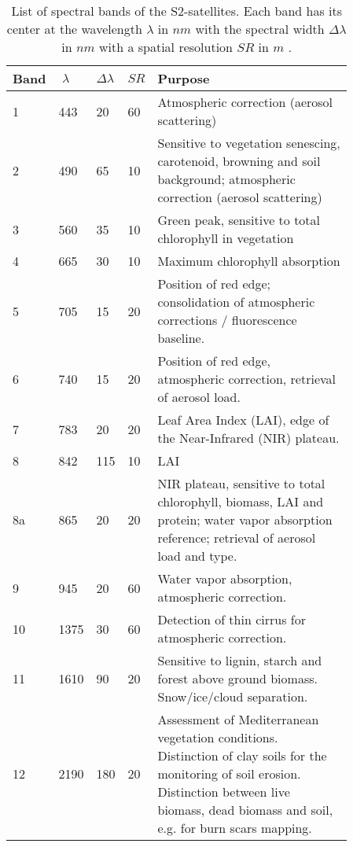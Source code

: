 \begin{table}[h]
    \centering
    \small
    \caption{List of spectral bands of the S2-satellites. Each band has its center at the wavelength $\lambda$ in $nm$ with the spectral width $\Delta\lambda$ in $nm$ with a spatial resolution $SR$ in $m$ \citep{jaramazESASentinel2Mission2013}.}
    \begin{tabular}{p{0.03\linewidth} p{0.04\linewidth} p{0.03\linewidth} p{0.03\linewidth} p{0.73\linewidth}}
    \toprule
        \hspace*{-5pt} Band & $\;\lambda$ & $\Delta\lambda$ & $SR$ & Purpose \\ \hline
        1 & 443 & 20 & 60 & Atmospheric correction (aerosol scattering) \\ %
        2 & 490 & 65 & 10 & Sensitive to vegetation senescing, carotenoid, browning and soil background; atmospheric correction (aerosol scattering) \\ %
        3 & 560 & 35 & 10 & Green peak, sensitive to total chlorophyll in vegetation \\ %
        4 & 665 & 30 & 10 & Maximum chlorophyll absorption \\ %
        5 & 705 & 15 & 20 & Position of red edge; consolidation of atmospheric corrections / fluorescence baseline. \\ %
        6 & 740 & 15 & 20 & Position of red edge, atmospheric correction, retrieval of aerosol load. \\ %
        7 & 783 & 20 & 20 & Leaf Area Index (LAI), edge of the Near-Infrared (NIR) plateau. \\ %
        8 & 842 & 115 & 10 & LAI \\ %
        8a & 865 & 20 & 20 & NIR plateau, sensitive to total chlorophyll, biomass, LAI and protein; water vapor absorption reference; retrieval of aerosol load and type. \\ %
        9 & 945 & 20 & 60 & Water vapor absorption, atmospheric correction. \\ %
        10 & 1375 & 30 & 60 & Detection of thin cirrus for atmospheric correction. \\ %
        11 & 1610 & 90 & 20 & Sensitive to lignin, starch and forest above ground biomass. Snow/ice/cloud separation. \\ %
        12 & 2190 & 180 & 20 & Assessment of Mediterranean vegetation conditions. Distinction of clay soils for the monitoring of soil erosion. Distinction between live biomass, dead biomass and soil, e.g. for burn scars mapping. \\
        \bottomrule
    \end{tabular}
    \label{table:S2-bands}
\end{table}
